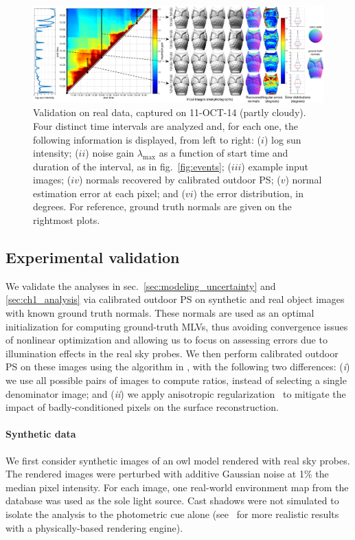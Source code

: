 \begin{figure}[t]
    \centering
    \includegraphics[width=0.92\linewidth]{./figures/realData/realData4.pdf}
    \caption[Validation on real data]{Validation on real data, captured on 11-OCT-14 (partly cloudy). Four distinct time intervals are analyzed and, for each one, the following information is displayed, from left to right: ($i$) log sun intensity; ($ii$) noise gain $\lambda_\text{max}$ as a function of start time and duration of the interval, as in fig.~\ref{fig:events}; ($iii$) example input images; ($iv$) normals recovered by calibrated outdoor PS; ($v$) normal estimation error at each pixel; and ($vi$) the error distribution, in degrees. For reference, ground truth normals are given on the rightmost plots.}
    \label{fig:real-results}
    \vspace{-2mm}
\end{figure}

\subsection{Experimental validation}

We validate the analyses in sec.~\ref{sec:modeling_uncertainty} and \ref{sec:ch1_analysis} via calibrated outdoor PS on synthetic and real object images with known ground truth normals. These normals are used as an optimal initialization for computing ground-truth MLVs, thus avoiding convergence issues of nonlinear optimization and allowing us to focus on assessing errors due to illumination effects in the real sky probes. We then perform calibrated outdoor PS on these images using the algorithm in \cite{yu-iccp-13}, with the following two differences: (\emph{i}) we use all possible pairs of images to compute ratios, instead of selecting a single denominator image; and (\emph{ii}) we apply anisotropic regularization~\cite{hernandez-pami-11} to mitigate the impact of badly-conditioned pixels on the surface reconstruction.

%
\vspace{-3mm}
\paragraph{Synthetic data}%
%
We first consider synthetic images of an owl model rendered with real sky probes. The rendered images were perturbed with additive Gaussian noise at 1\% the median pixel intensity. For each image, one real-world environment map from the database was used as the sole light source. Cast shadows were not simulated to isolate the analysis to the photometric cue alone (see~\cite{webpageXhourPS} for more realistic results with a physically-based rendering engine). 

